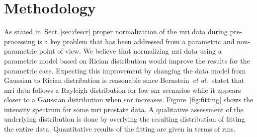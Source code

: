 \section{Methodology}
\label{sec:method}
\graphicspath{ {./content/method/figures/} }


As stated in~Sect.\,\ref{sec:descr} proper normalization of the \ac{mri} data during pre-processing is a key problem that has been addressed from a parametric and non-parametric point of view.
We believe that normalizing \ac{mri} data using a parametric model based on Rician distribution would improve the results for the parametric case.
Expecting this improvement by changing the data model from Gaussian to Rician distribution is reasonable since Bernstein~\emph{et al.}\,\cite{bernstein1989improved} statet that \ac{mri} data follows a Rayleigh distribution for low \ac{snr} scenarios while it appears closer to a Gaussian distribution when \ac{snr} increases.
Figure~\ref{fig:fitting} shows the intensity spectrum for some \ac{mri} prostate data.
A qualitative assessment of the underlying distribution is done by overlying the resulting distribution of fitting the entire data.
Quantitative results of the fitting are given in terms of \ac{rms}.

